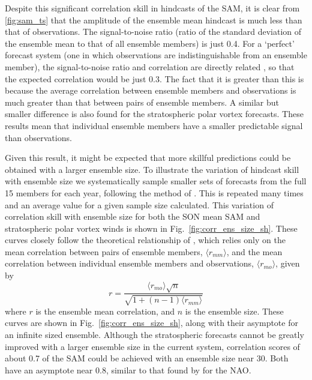 Despite this significant correlation skill in hindcasts of the SAM, it is clear
from \ref{fig:sam_ts} that the amplitude of the ensemble mean hindcast is much
less than that of observations. The signal-to-noise ratio (ratio of the standard
deviation of the ensemble mean to that of all ensemble members) is just 0.4. For
a `perfect' forecast system (one in which observations are indistinguishable
from an ensemble member), the signal-to-noise ratio and correlation are directly
related \citep{Kumar2009}, so that the expected correlation would be just
0.3. The fact that it is greater than this is because the average correlation
between ensemble members and observations is much greater than that between
pairs of ensemble members. A similar but smaller difference is also found for
the stratospheric polar vortex forecasts. These results mean that individual
ensemble members have a smaller predictable signal than observations.

Given this result, it might be expected that more skillful predictions could be
obtained with a larger ensemble size. To illustrate the variation of hindcast
skill with ensemble size we systematically sample smaller sets of forecasts from
the full 15 members for each year, following the method of
\citet{Scaife2013}. This is repeated many times and an average value for a given
sample size calculated. This variation of correlation skill with ensemble size
for both the SON mean SAM and stratospheric polar vortex winds is shown in Fig.\
\ref{fig:corr_ens_size_sh}. These curves closely follow the theoretical
relationship of \citet{Murphy1990}, which relies only on the mean correlation
between pairs of ensemble members, $\langle r_{mm} \rangle$, and the mean
correlation between individual ensemble members and observations,
$\langle r_{mo} \rangle$, given by
\begin{equation} r = \frac{\langle r_{mo} \rangle \sqrt{n}}{\sqrt{1+(n-1)\langle
r_{mm} \rangle}}
\end{equation} where $r$ is the ensemble mean correlation, and $n$ is the
ensemble size. These curves are shown in Fig.\ \ref{fig:corr_ens_size_sh}, along
with their asymptote for an infinite sized ensemble. Although the stratospheric forecasts
cannot be greatly improved with a larger ensemble size in the current system,
correlation scores of about 0.7 of the SAM could be achieved with an ensemble
size near 30. Both have an asymptote near 0.8, similar to that found by
\citet{Scaife2013} for the NAO.

